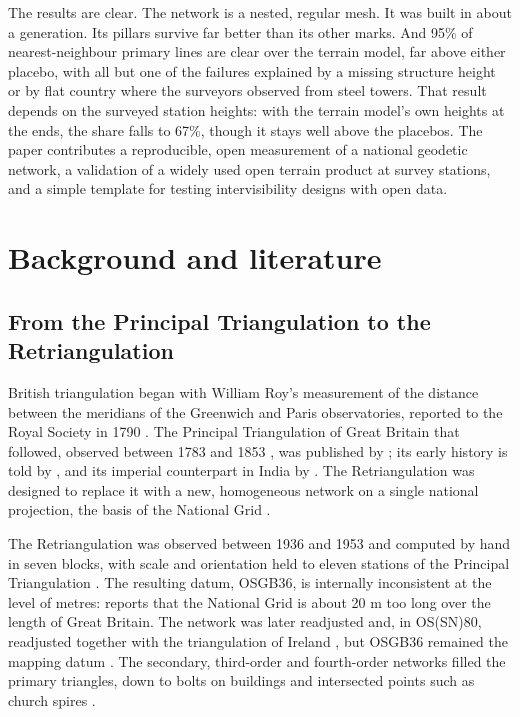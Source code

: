 \documentclass[11pt,a4paper]{article}
\begin{document}
The results are clear. The network is a nested, regular mesh. It was built in about a generation. Its pillars survive far better than its other marks. And 95\% of nearest-neighbour primary lines are clear over the terrain model, far above either placebo, with all but one of the failures explained by a missing structure height or by flat country where the surveyors observed from steel towers. That result depends on the surveyed station heights: with the terrain model's own heights at the ends, the share falls to 67\%, though it stays well above the placebos. The paper contributes a reproducible, open measurement of a national geodetic network, a validation of a widely used open terrain product at survey stations, and a simple template for testing intervisibility designs with open data.

\section{Background and literature}\label{sec:lit}
\subsection{From the Principal Triangulation to the Retriangulation}
British triangulation began with William Roy's measurement of the distance between the meridians of the Greenwich and Paris observatories, reported to the Royal Society in 1790 \citep{roy1790}. The Principal Triangulation of Great Britain that followed, observed between 1783 and 1853 \citep{osblog2016}, was published by \citet{clarke1858}; its early history is told by \citet{hewitt2010}, and its imperial counterpart in India by \citet{edney1997}. The Retriangulation was designed to replace it with a new, homogeneous network on a single national projection, the basis of the National Grid \citep{os1967,seymour1980,owen1992}.

The Retriangulation was observed between 1936 and 1953 and computed by hand in seven blocks, with scale and orientation held to eleven stations of the Principal Triangulation \citep{greaves2004}. The resulting datum, OSGB36, is internally inconsistent at the level of metres: \citet{greaves2004} reports that the National Grid is about 20 m too long over the length of Great Britain. The network was later readjusted \citep{ashkenazi1972} and, in OS(SN)80, readjusted together with the triangulation of Ireland \citep{ashkenazi1983}, but OSGB36 remained the mapping datum \citep{greaves2004}. The secondary, third-order and fourth-order networks filled the primary triangles, down to bolts on buildings and intersected points such as church spires \citep{seymour1980,owen1992}.
\end{document}
